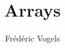 \documentclass{../khlslides}
\title[Arrays]{Arrays}
\author{Fr\'ed\'eric Vogels}
\begin{document}
\begin{frame}
  \titlepage
\end{frame}





\end{document}
